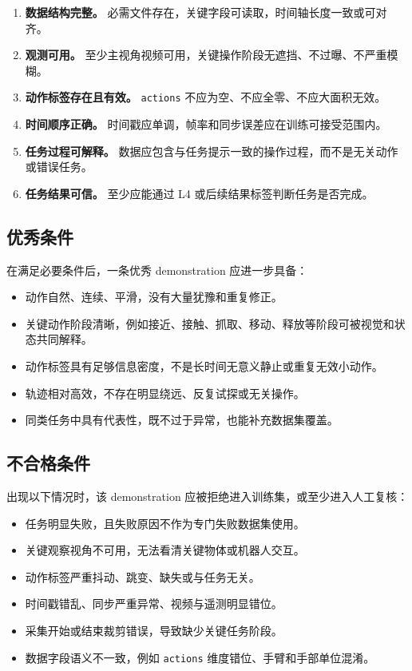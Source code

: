 \documentclass[UTF8,zihao=-4]{ctexart}
\begin{document}
\begin{enumerate}
  \item \textbf{数据结构完整。} 必需文件存在，关键字段可读取，时间轴长度一致或可对齐。
  \item \textbf{观测可用。} 至少主视角视频可用，关键操作阶段无遮挡、不过曝、不严重模糊。
  \item \textbf{动作标签存在且有效。} \texttt{actions} 不应为空、不应全零、不应大面积无效。
  \item \textbf{时间顺序正确。} 时间戳应单调，帧率和同步误差应在训练可接受范围内。
  \item \textbf{任务过程可解释。} 数据应包含与任务提示一致的操作过程，而不是无关动作或错误任务。
  \item \textbf{任务结果可信。} 至少应能通过 L4 或后续结果标签判断任务是否完成。
\end{enumerate}

\subsection{优秀条件}

在满足必要条件后，一条优秀 demonstration 应进一步具备：

\begin{itemize}
  \item 动作自然、连续、平滑，没有大量犹豫和重复修正。
  \item 关键动作阶段清晰，例如接近、接触、抓取、移动、释放等阶段可被视觉和状态共同解释。
  \item 动作标签具有足够信息密度，不是长时间无意义静止或重复无效小动作。
  \item 轨迹相对高效，不存在明显绕远、反复试探或无关操作。
  \item 同类任务中具有代表性，既不过于异常，也能补充数据集覆盖。
\end{itemize}

\subsection{不合格条件}

出现以下情况时，该 demonstration 应被拒绝进入训练集，或至少进入人工复核：

\begin{itemize}
  \item 任务明显失败，且失败原因不作为专门失败数据集使用。
  \item 关键观察视角不可用，无法看清关键物体或机器人交互。
  \item 动作标签严重抖动、跳变、缺失或与任务无关。
  \item 时间戳错乱、同步严重异常、视频与遥测明显错位。
  \item 采集开始或结束裁剪错误，导致缺少关键任务阶段。
  \item 数据字段语义不一致，例如 \texttt{actions} 维度错位、手臂和手部单位混淆。
\end{itemize}
\end{document}
